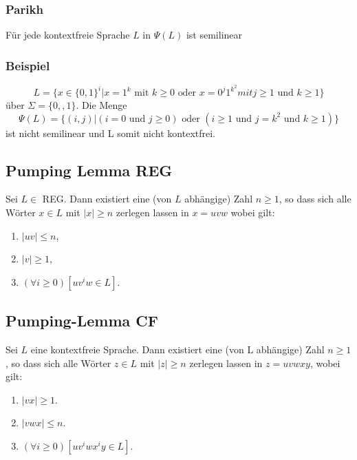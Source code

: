 \documentclass[9pt, a4paper]{article}
\begin{document}
\subsubsection{Parikh}
Für jede kontextfreie Sprache $L$ in $\Psi(L)$ ist semilinear
\subsubsection{Beispiel}
$$L = \{x \in \{0, 1\}^i | x = 1^k \text{ mit } k \ge 0 \text{ oder }  x = 0^j1^{k^2} mit j \ge 1 \text{ und } k \ge 1\}$$
über $\Sigma = \{0, ,1\}$. Die Menge
$$ \Psi(L) = \{(i, j)|(i = 0\text{ und }j \ge 0) \text{ oder } (i \ge 1 \text{ und } j = k^2 \text{ und } k \ge 1)\}$$
ist nicht semilinear und L somit nicht kontextfrei.

\subsection{Pumping Lemma REG}
Sei $L \in$ REG. Dann existiert eine (von $L$ abhängige) Zahl $n \geq 1$, so dass sich alle Wörter $x \in L$ mit $|x|\geq n$ zerlegen lassen in $x = uvw$ wobei gilt:
\begin{enumerate}
	\item $|uv| \leq n$,
	\item $|v| \geq 1$,
	\item $(\forall i \geq 0)[uv^iw \in L]$.
\end{enumerate}

\subsection{Pumping-Lemma CF}
Sei $L$ eine kontextfreie Sprache. Dann existiert eine (von L abhängige) Zahl $n \ge 1$, so dass sich alle Wörter $z \in L$ mit $|z| \ge n$ zerlegen lassen in $z = uvwxy$, wobei gilt:
\begin{enumerate}
	\item $|vx| \ge 1$.
	\item $|vwx| \le n$.
	\item $(\forall i \ge 0)[uv^iwx^iy \in L]$.
\end{enumerate}
\end{document}
